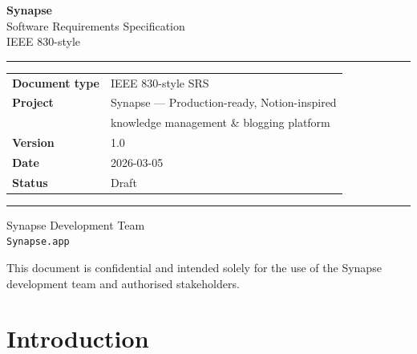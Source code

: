 \documentclass[12pt, a4paper]{article}
\begin{document}
\begin{titlepage}
  \centering
  \vspace*{2cm}

  {\Huge\bfseries\color{primary} Synapse}\\[0.4em]
  {\Large\color{muted} Software Requirements Specification}\\[0.2em]
  {\normalsize\color{muted} IEEE 830-style}

  \vspace{1.5cm}
  \rule{0.6\linewidth}{1.5pt}
  \vspace{1cm}

  \begin{tabular}{@{}ll@{}}
    \textbf{Document type} & IEEE 830-style SRS \\[4pt]
    \textbf{Project}       & Synapse — Production-ready, Notion-inspired \\
                           & knowledge management \& blogging platform \\[4pt]
    \textbf{Version}       & 1.0 \\[4pt]
    \textbf{Date}          & 2026-03-05 \\[4pt]
    \textbf{Status}        & Draft \\
  \end{tabular}

  \vspace{2cm}
  \rule{0.6\linewidth}{0.8pt}
  \vspace{0.5cm}

  {\small\color{muted}
    Synapse Development Team\\
    \texttt{Synapse.app}
  }

  \vfill
  {\footnotesize\color{muted}
    This document is confidential and intended solely for the use of the
    Synapse development team and authorised stakeholders.
  }
\end{titlepage}

\tableofcontents
\newpage

\section{Introduction}
\end{document}
